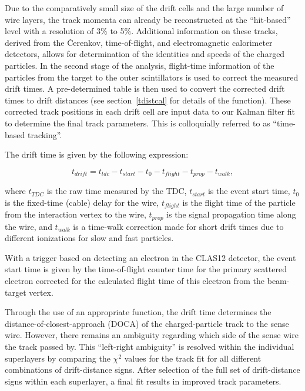 Due to the comparatively small size of the drift cells and the large 
number of wire layers, the track momenta can already be reconstructed 
at the ``hit-based'' level with a 
resolution of 3$\%$ to 5$\%$.  Additional information on these tracks, derived
from the {\v C}erenkov, time-of-flight, and electromagnetic calorimeter 
detectors, allows for determination of the identities and speeds of the 
charged particles.  In the second stage of the analysis, flight-time 
information of the particles from the target to the outer scintillators is 
used to correct the measured drift times.  A pre-determined table is then used
to convert the corrected drift times to drift distances (see section~\ref{tdistcal} 
for details of the function). These corrected 
track positions in each drift cell are input data to our Kalman filter
fit to determine the final track parameters.  This is colloquially referred
to as ``time-based tracking''.

The drift time is given by the following expression:

\begin{equation} 
\label{drift}
t_{drift} = t_{tdc} - t_{start} - t_{0} - t_{flight} - t_{prop} - t_{walk},
\end{equation}

\noindent
where $t_{TDC}$ is the raw time measured by the TDC, $t_{start}$ is the event start time, 
$t_0$ is the fixed-time (cable) delay for the wire, $t_{flight}$ is the 
flight time of the particle from the interaction vertex to the wire, $t_{prop}$ 
is the signal propagation time along the wire, and $t_{walk}$ is a time-walk 
correction made for short drift times due to different ionizations for slow 
and fast particles.  

With a trigger based on detecting an electron in the CLAS12 detector, the event start time is 
given by the time-of-flight counter time for the primary scattered electron 
corrected for the calculated flight time of this electron from the beam-target vertex.

Through the use of an appropriate function, the drift time determines the 
distance-of-closest-approach (DOCA) of the charged-particle track to the sense 
wire.  However, there remains an ambiguity regarding which side of the sense 
wire the track passed by.  This ``left-right ambiguity'' is resolved within 
the individual superlayers by comparing the $\chi^2$ values for the track fit 
for all different combinations of drift-distance signs.  After selection of 
the full set of drift-distance signs within each superlayer, a final fit 
results in improved track parameters.


